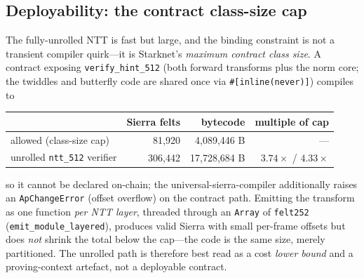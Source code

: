 \documentclass[11pt]{article}
\begin{document}
\subsection{Deployability: the contract class-size cap}\label{sec:deploy}
The fully-unrolled NTT is fast but large, and the binding constraint is not a transient compiler
quirk---it is Starknet's \emph{maximum contract class size}. A contract exposing
\texttt{verify\_hint\_512} (both forward transforms plus the norm core; the twiddles and butterfly
code are shared once via \verb|#[inline(never)]|) compiles to
\begin{center}
\begin{tabular}{lrrr}
\toprule
 & Sierra felts & bytecode & multiple of cap \\
\midrule
allowed (class-size cap) & 81{,}920 & 4{,}089{,}446 B & --- \\
unrolled \texttt{ntt\_512} verifier & 306{,}442 & 17{,}728{,}684 B & $3.74\times$ / $4.33\times$ \\
\bottomrule
\end{tabular}
\end{center}
so it cannot be declared on-chain; the universal-sierra-compiler additionally raises an
\texttt{ApChangeError} (offset overflow) on the contract path. Emitting the transform as one
function \emph{per NTT layer}, threaded through an \texttt{Array} of \texttt{felt252}
(\texttt{emit\_module\_layered}), produces valid Sierra with small per-frame offsets but does
\emph{not} shrink the total below the cap---the code is the same size, merely partitioned. The
unrolled path is therefore best read as a cost \emph{lower bound} and a proving-context artefact,
not a deployable contract.
\end{document}

